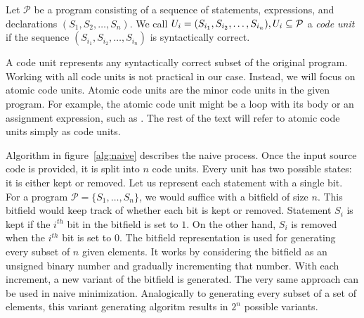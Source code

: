 \begin{defn}\label{def04:3}
  Let $\mathcal{P}$ be a program consisting of a sequence of statements, 
  expressions, and declarations $(S_1, S_2, \ldots, S_n)$. 
  We call $U_i = (S_{i_1},\-S_{i_2},\-\ldots,\-S_{i_n}), 
  U_i \subseteq \mathcal{P}$ a \emph{code unit} if the sequence 
  $(S_{i_1}, S_{i_2}, \ldots, S_{i_n})$ is syntactically
  correct.
\end{defn}

A code unit represents any syntactically correct subset of the original 
program. 
Working with all code units is not practical in our case. 
Instead, we will focus on atomic code units. 
Atomic code units are the minor code units in the given program. 
For example, the atomic code unit might be a  loop with its body 
or an assignment expression, such as .
The rest of the text will refer to atomic code units simply as code units. 

Algorithm in figure~\ref{alg:naive} describes the naive process. 
Once the input source code is provided, it is split into $n$ code units.
Every unit has two possible states: it is either kept or removed.
Let us represent each statement with a single bit. 
For a program $\mathcal{P} = \{S_1, \ldots, S_n\}$, we would suffice with 
a bitfield of size $n$. 
This bitfield would keep track of whether each bit is kept or removed. 
Statement $S_i$ is kept if the $i^{th}$ bit in the bitfield is set to $1$. 
On the other hand, $S_i$ is removed when the $i^{th}$ bit is set to $0$.
The bitfield representation is used for generating every subset of $n$ given
elements. 
It works by considering the bitfield as an unsigned binary number and 
gradually incrementing that number. 
With each increment, a new variant of the bitfield is generated. 
The very same approach can be used in naive minimization.
Analogically to generating every subset of a set of elements, this
variant generating algoritm results in $2^n$ possible variants.

